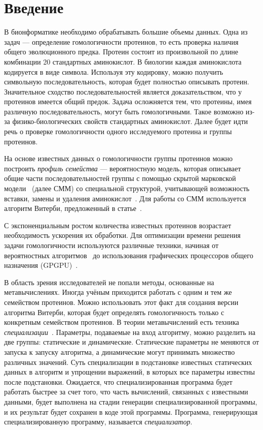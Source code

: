 \section*{Введение}

В бионформатике необходимо обрабатывать большие объемы данных.
Одна из задач --- определение гомологичности протеинов, то есть проверка наличия общего эволюционного предка.
Протеин состоит из произвольной по длине комбинации 20 стандартных аминокислот.
В биологии каждая аминокислота кодируется в виде символа.
Используя эту кодировку, можно получить символьную последовательность,
которая будет полностью описывать протеин.
Значительное сходство последовательностей является доказательством, что у
протеинов имеется общий предок.
Задача осложняется тем, что протеины, имея различную последовательность, могут
быть гомологичными.
Такое возможно из-за физико-биологических свойств стандартных аминокислот.
Далее будет идти речь о проверке гомологичности одного исследуемого протеина и группы протеинов.

На основе известных данных о гомологичности группы протеинов можно построить
\emph{профиль семейства} --- вероятностную модель, которая описывает общие
части последовательностей группы с помощью  скрытой 
марковской модели~\cite{Eddy_CHMM} (далее СММ) со 
специальной структурой, учитывающей возможность вставки, 
замены и удаления аминокислот~\cite{HMM_Eddy}.
Для работы со СММ используется алгоритм Витерби, 
предложенный в статье~\cite{Viterbi}.

С экспоненциальным ростом количества известных протеинов возрастает
необходимость ускорения их обработки.
Для оптимизации времени решения задачи гомологичности используются различные 
техники, начиная от вероятностных алгоритмов~\cite{MSV_Eddy} до использования
графических процессоров общего назначения (GPGPU)~\cite{cudampf}.

В область зрения исследователей не попали методы, основанные на
метавычислениях.
Иногда учёным приходится работать с одним и тем же семейством
протеинов.
Можно использовать этот факт для создания версии алгоритма Витерби, 
которая будет определять гомологичность только с конкретным семейством протеинов.
В теории метавычислений есть техника \emph{специализации}~\cite{Jones_spec}.
Параметры, подаваемые на вход алгоритму, можно разделить на две группы:
статические и динамические.
Статические параметры не меняются от запуска к запуску алгоритма, а 
динамические могут принимать множество различных значений.
Суть специализации в подстановке известных статических данных в алгоритм и
упрощении выражений, в которых все параметры известны после подстановки.
Ожидается, что специализированная программа будет работать быстрее за счет
того, что часть вычислений, связанных с известными данными, будет выполнена на
стадии генерации специализированной программы, и их результат будет сохранен в
коде этой программы.
Программа, генерирующая специализированную программу, называется \emph{специализатор}.

